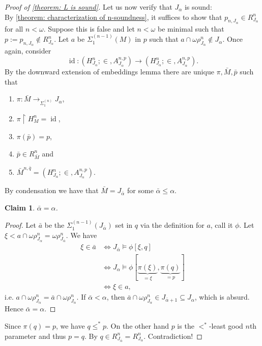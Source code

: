 \documentclass[12pt,a4paper]{article}
\theoremstyle{nicestyle}
\newtheorem{claim}{Claim}[subsection]
\newenvironment{proofblack}{\begin{proof}}
  {\renewcommand{\qedsymbol}{$\blacksquare$}\end{proof}}
\DeclareMathOperator{\id}{id}
\begin{document}
\begin{proof}[Proof of \autoref{theorem: L is sound}]
      Let us now verify that $J_{\alpha}$ is sound: \\

      By \autoref{theorem: characterization of n-soundness}, it
      suffices to show that $p_{n, J_{\alpha}} \in R^{n}_{J_{\alpha}}$
      for all $n < \omega$. Suppose this is false and let $n < \omega$
      be minimal such that
      $p :=p_{n,J_{\alpha}} \not \in R^{n}_{J_{\alpha}}$. Let $a$ be
      $\Sigma^{(n-1)}_{1}(M)$ in $p$ such that
      $a \cap \omega\rho^{n}_{J_{\alpha}} \not \in J_{\alpha}$. Once
      again, consider
      \[
	\id \colon (H^{n}_{J_{\alpha}}; \in, A^{n, p}_{J_{\alpha}}) \to
        (H^{n}_{J_{\alpha}}; \in, A^{n, p}_{J_{\alpha}}).
      \]
      By the downward extension of embeddings lemma there are unique
      $\pi, \bar{M}, \bar{p}$ such that
      \begin{enumerate}
      \item $\pi \colon \bar{M} \to_{\Sigma^{(n)}_{1}} J_{\alpha}$,
      \item $\pi \restriction H^{n}_{M} = \id$,
      \item $\pi(\bar{p}) = p$,
      \item $\bar{p} \in R^{n}_{\bar{M}}$ and
      \item
        $\bar{M}^{n, \bar{q}} = (H^{n}_{J_{\alpha}}; \in, A^{n,
          p}_{J_{\alpha}})$.
      \end{enumerate}
      By condensation we have that $\bar{M} = J_{\bar{\alpha}}$ for
      some $\bar{\alpha} \leq \alpha$.

      \begin{claim}
        $\bar{\alpha} = \alpha$.
      \end{claim}

      \begin{proofblack}
        Let $\bar{a}$ be the $\Sigma^{(n-1)}_{1}(J_{\bar{\alpha}})$
        set in $q$ via the definition for $a$, call it $\phi$. Let
        $\xi < a \cap \omega\rho^{n}_{J_{\alpha}} =
        \omega\rho^{n}_{J_{\bar{\alpha}}}$. We have
        \begin{align*}
          \xi \in \bar{a} & \iff J_{\bar{\alpha}} \models \phi[\xi, q] \\
                          & \iff J_{\alpha} \models \phi[\underbrace{\pi(\xi)}_{= \xi}, \underbrace{\pi(q)}_{= p}] \\
                          & \iff \xi \in a,
        \end{align*}
        i.e.
        $a \cap \omega\rho^{n}_{J_{\alpha}} = \bar{a} \cap
        \omega\rho^{n}_{J_{\alpha}}$. If $\bar{\alpha} < \alpha$, then
        $\bar{a} \cap \omega\rho^{n}_{J_{\alpha}} \in
        J_{\bar{\alpha}+1} \subseteq J_{\alpha}$, which is
        absurd. Hence $\bar{\alpha} = \alpha$.
      \end{proofblack}

      Since $\pi(q) = p$, we have $q \le^{*} p$. On the other hand $p$
      is the $<^{*}$-least good $n$th parameter and thus $p = q$. By
      $q \in R^{n}_{J_{\bar{\alpha}}} =
      R^{n}_{J_{\alpha}}$. Contradiction!
    \end{proof}
\end{document}
